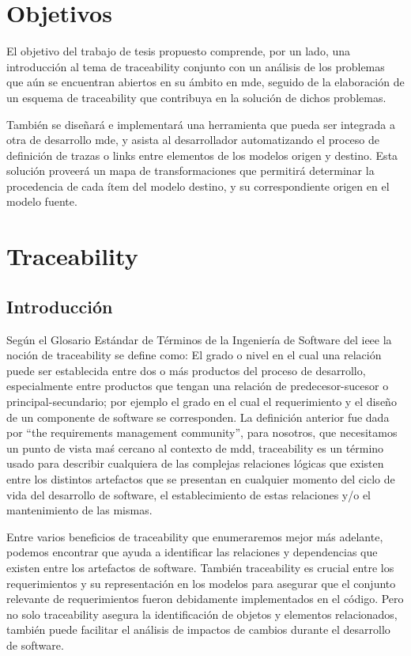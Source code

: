\documentclass[a4paper,12pt,oneside,spanish]{book}
\begin{document}
\chapter{Objetivos}


El objetivo del trabajo de tesis propuesto comprende, por un lado, una introducción al tema de traceability conjunto con un análisis de los problemas que aún se encuentran abiertos en su ámbito en \gls{mde}, seguido de la elaboración de un esquema de traceability que contribuya en la solución de dichos problemas.

También se diseñará e implementará una herramienta que pueda ser integrada a otra de desarrollo \gls{mde}, y asista al desarrollador automatizando el proceso de definición de trazas o links entre elementos de los modelos origen y destino. Esta solución proveerá un mapa de transformaciones que permitirá determinar la procedencia de cada ítem del modelo destino, y su correspondiente origen en el modelo fuente.


\mainmatter
\chapter{Traceability}

\section{Introducción}

Según el Glosario Estándar de Términos de la Ingeniería de Software del \gls{ieee} \cite{IEEE} la noción de traceability se define como: El grado o nivel en el cual una relación puede ser establecida entre dos o más productos del proceso de desarrollo, especialmente entre productos que tengan una relación de predecesor-sucesor o principal-secundario; por ejemplo el grado en el cual el requerimiento y el diseño de un componente de software se corresponden. La definición anterior fue dada por “the requirements management community”, para nosotros, que necesitamos un punto de vista maś cercano al contexto de \gls{mdd}, traceability es un término usado para describir cualquiera de las complejas relaciones lógicas que existen entre los distintos artefactos que se presentan en cualquier momento del ciclo de vida del desarrollo de software, el establecimiento de estas relaciones y/o el mantenimiento de las mismas.

Entre varios beneficios de traceability que enumeraremos mejor más adelante, podemos encontrar que ayuda a identificar las relaciones y dependencias que existen entre los artefactos de software. También traceability es crucial entre los requerimientos y su representación en los modelos para asegurar que el conjunto relevante de requerimientos fueron debidamente implementados en el código. Pero no solo traceability asegura la identificación de objetos y elementos relacionados, también puede facilitar el análisis de impactos de cambios durante el desarrollo de software.
\end{document}
